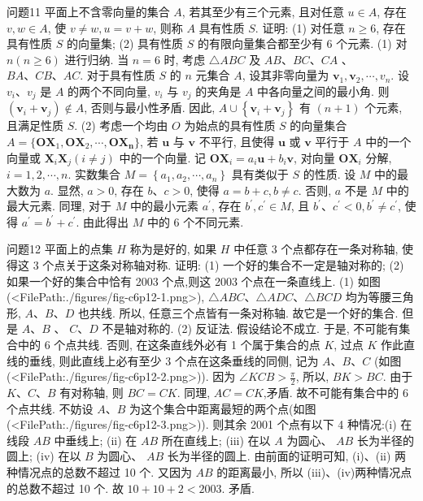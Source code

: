 问题11 平面上不含零向量的集合 $A$, 若其至少有三个元素, 且对任意 $u \in A$, 存在 $v, w \in A$, 使 $v \neq w, u=v+w$, 则称 $A$ 具有性质 $S$. 证明:
(1) 对任意 $n \geqslant 6$, 存在具有性质 $S$ 的向量集;
(2) 具有性质 $S$ 的有限向量集合都至少有 6 个元素.
(1) 对 $n(n \geqslant 6)$ 进行归纳.
当 $n=6$ 时, 考虑 $\triangle A B C$ 及 $A B 、 B C 、 C A$ 、 $B A 、 C B 、 A C$. 对于具有性质 $S$ 的 $n$ 元集合 $A$, 设其非零向量为 $\boldsymbol{v}_1, \boldsymbol{v}_2, \cdots, v_n$. 设 $v_i 、 v_j$ 是 $A$ 的两个不同向量, $v_i$ 与 $v_j$ 的夹角是 $A$ 中各向量之间的最小角.
则 $\left(\boldsymbol{v}_i+\boldsymbol{v}_j\right) \notin A$, 否则与最小性矛盾.
因此, $A \cup\left\{\boldsymbol{v}_i+\boldsymbol{v}_j\right\}$ 有 $(n+1)$ 个元素, 且满足性质 $S$.
(2) 考虑一个均由 $O$ 为始点的具有性质 $S$ 的向量集合 $A= \{\boldsymbol{O} \boldsymbol{X}_1,\boldsymbol{O} \boldsymbol{X}_2, \cdots, \boldsymbol{O X _ { n }} \}$, 若 $\boldsymbol{u}$ 与 $\boldsymbol{v}$ 不平行, 且使得 $\boldsymbol{u}$ 或 $\boldsymbol{v}$ 平行于 $A$ 中的一个向量或 $\boldsymbol{X}_i \boldsymbol{X}_j (i \neq j)$ 中的一个向量.
记 $\boldsymbol{O} \boldsymbol{X}_i=a_i \boldsymbol{u}+b_i \boldsymbol{v}$, 对向量 $\boldsymbol{O} \boldsymbol{X}_i$ 分解, $i=1,2, \cdots, n$. 实数集合 $M=\left\{a_1, a_2, \cdots, a_n\right\}$ 具有类似于 $S$ 的性质.
设 $M$ 中的最大数为 $a$. 显然, $a>0$, 存在 $b 、 c>0$, 使得 $a=b+c, b \neq c$. 否则, $a$ 不是 $M$ 中的最大元素.
同理, 对于 $M$ 中的最小元素 $a^{\prime}$, 存在 $b^{\prime}, c^{\prime} \in M$, 且 $b^{\prime} 、 c^{\prime}<0, b^{\prime} \neq c^{\prime}$, 使得 $a^{\prime}=b^{\prime}+c^{\prime}$. 由此得出 $M$ 中的 6 个不同元素.



问题12 平面上的点集 $H$ 称为是好的, 如果 $H$ 中任意 3 个点都存在一条对称轴, 使得这 3 个点关于这条对称轴对称.
证明:
(1) 一个好的集合不一定是轴对称的;
(2) 如果一个好的集合中恰有 2003 个点,则这 2003 个点在一条直线上.
(1) 如图(<FilePath:./figures/fig-c6p12-1.png>), $\triangle A B C 、 \triangle A D C 、 \triangle B C D$ 均为等腰三角形, $A 、 B 、 D$ 也共线.
所以, 任意三个点皆有一条对称轴.
故它是一个好的集合.
但是 $A 、 B$ 、 $C 、 D$ 不是轴对称的.
(2) 反证法.
假设结论不成立.
于是, 不可能有集合中的 6 个点共线.
否则, 在这条直线外必有 1 个属于集合的点 $K$, 过点 $K$ 作此直线的垂线, 则此直线上必有至少 3 个点在这条垂线的同侧, 记为 $A 、 B 、 C$ (如图(<FilePath:./figures/fig-c6p12-2.png>)). 因为 $\angle K C B>\frac{\pi}{2}$, 所以, $B K>B C$. 由于 $K 、 C 、 B$ 有对称轴, 则 $B C=C K$. 同理, $A C=C K$,矛盾.
故不可能有集合中的 6 个点共线.
不妨设 $A 、 B$ 为这个集合中距离最短的两个点(如图(<FilePath:./figures/fig-c6p12-3.png>)). 则其余 2001 个点有以下 4 种情况:(i) 在线段 $A B$ 中垂线上; (ii) 在 $A B$ 所在直线上; (iii) 在以 $A$ 为圆心、 $A B$ 长为半径的圆上; (iv) 在以 $B$ 为圆心、 $A B$ 长为半径的圆上.
由前面的证明可知, (i)、(ii) 两种情况点的总数不超过 10 个.
又因为 $A B$ 的距离最小, 所以 (iii)、(iv)两种情况点的总数不超过 10 个.
故 $10+10+2<2003$. 矛盾.




